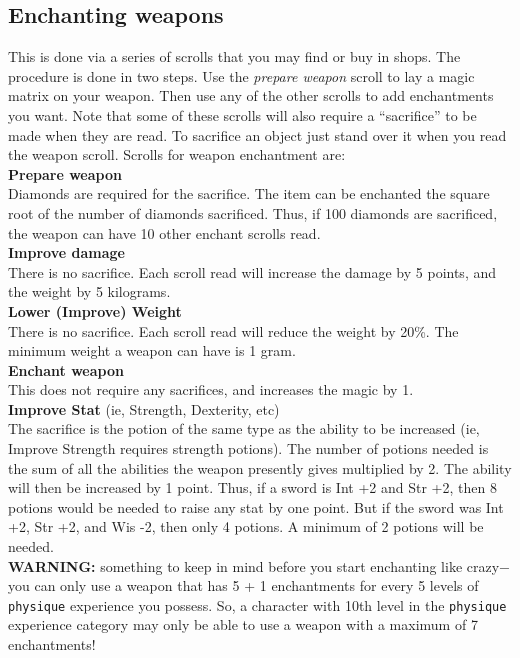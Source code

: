 \subsection{Enchanting weapons}

This is done via a series of scrolls that you 
may find or buy in
shops. The procedure is done in two steps. Use the {\em prepare weapon} scroll
to lay a magic matrix on your weapon. Then use any of the other
scrolls to add enchantments you want. Note that some of these scrolls will
also require a ``sacrifice'' to be made when they are read. To sacrifice
an object just stand over it when you read the weapon scroll. Scrolls 
for weapon enchantment are: \\

{\bf Prepare weapon} \\
Diamonds are required for the sacrifice. The item
can be enchanted the square root of the number of diamonds sacrificed. Thus,
if 100 diamonds are sacrificed, the weapon can have 10 other enchant scrolls
read. \\ 

{\bf Improve damage} \\ 
     There is no sacrifice. Each scroll read will increase the damage by 5
     points, and the weight by 5 kilograms. \\ 

{\bf Lower (Improve) Weight} \\ 
     There is no sacrifice. Each scroll read will reduce the weight by 20\%.
     The minimum weight a weapon can have is 1 gram. \\ 

{\bf Enchant weapon} \\ 
     This does not require any sacrifices, and increases the magic by 1. \\ 

{\bf Improve Stat} (ie, Strength, Dexterity, etc) \\ 
     The sacrifice is the potion of the same type 
as the ability to be
     increased (ie, Improve Strength requires strength potions). The number
     of potions needed is the sum of all the abilities the weapon presently
     gives multiplied by 2. The ability will then be increased by 1 point.
     Thus, if a sword is Int +2 and Str +2, then 8 potions would be needed to
     raise any stat by one point. But if the sword was Int +2, Str +2, and Wis -2,
     then only 4 potions. A minimum of 2 potions will be needed. \\ 

{\bf WARNING:} something to keep in mind before you start enchanting 
like crazy$-$you can only use a weapon that has 5 + 1 enchantments 
for every 5 levels of 
{\tt physique} experience you possess. So, a character with 
10th level in the {\tt physique} experience category may only be able to 
use a weapon with a maximum of 7 enchantments!
